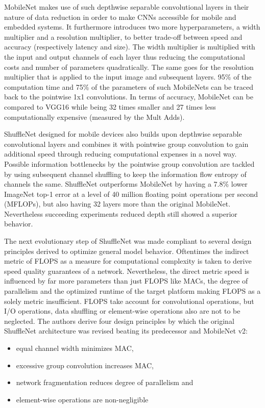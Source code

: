 MobileNet makes use of such depthwise separable convolutional layers in their nature of data reduction in order to make CNNs accessible for mobile and embedded systems. It furthermore introduces two more hyperparameters, a width multiplier and a resolution multiplier, to better trade-off between speed and accuracy (respectively latency and size). The width multiplier is multiplied with the input and output channels of each layer thus reducing the computational costs and number of parameters quadratically. The same goes for the resolution multiplier that is applied to the input image and subsequent layers. 95\% of the computation time and 75\% of the parameters of such MobileNets can be traced back to the pointwise 1x1 convolutions. In terms of accuracy, MobileNet can be compared to VGG16 while being 32 times smaller and 27 times less computationally expensive (measured by the Mult Adds). \cite{AndrewGHoward.2017}

ShuffleNet designed for mobile devices also builds upon depthwise separable convolutional layers and combines it with pointwise group convolution to gain additional speed through reducing computational expenses in a novel way. Possible information bottlenecks by the pointwise group convolution are tackled by using subsequent channel shuffling to keep the information flow entropy of channels the same. ShuffleNet outperforms MobileNet by having a 7.8\% lower ImageNet \cite{JiaDeng.2009} top-1 error at a level of 40 million floating point operations per second (MFLOPs), but also having 32 layers more than the original MobileNet. Nevertheless succeeding experiments reduced depth still showed a superior behavior. \cite{XiangyuZhang.2017}

The next evolutionary step of ShuffleNet was made compliant to several design principles derived to optimize general model behavior. Oftentimes the indirect metric of FLOPS as a measure for computational complexity is taken to derive speed quality guarantees of a network. Nevertheless, the direct metric speed is influenced by far more parameters than just FLOPS like MACs, the degree of parallelism and the optimized runtime of the target platform making FLOPS as a solely metric insufficient. FLOPS take account for convolutional operations, but I/O operations, data shuffling or element-wise operations also are not to be neglected. The authors derive four design principles by which the original ShuffleNet architecture was revised beating its predecessor and MobileNet v2: \cite{NingningMa.2018}

\begin{itemize}
	\item equal channel width minimizes MAC, 
	\item excessive group convolution increases MAC, 
	\item network fragmentation reduces degree of parallelism and
	\item element-wise operations are non-negligible
\end{itemize}

